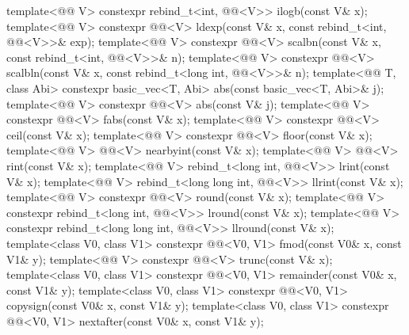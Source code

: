 \begin{itemdecl}
template<@@ V>
  constexpr rebind_t<int, @@<V>> ilogb(const V& x);
template<@@ V>
  constexpr @@<V> ldexp(const V& x, const rebind_t<int, @@<V>>& exp);
template<@@ V>
  constexpr @@<V> scalbn(const V& x, const rebind_t<int, @@<V>>& n);
template<@@ V>
  constexpr @@<V>
    scalbln(const V& x, const rebind_t<long int, @@<V>>& n);
template<@@ T, class Abi>
  constexpr basic_vec<T, Abi> abs(const basic_vec<T, Abi>& j);
template<@@ V>
  constexpr @@<V> abs(const V& j);
template<@@ V>
  constexpr @@<V> fabs(const V& x);
template<@@ V>
  constexpr @@<V> ceil(const V& x);
template<@@ V>
  constexpr @@<V> floor(const V& x);
template<@@ V>
  @@<V> nearbyint(const V& x);
template<@@ V>
  @@<V> rint(const V& x);
template<@@ V>
  rebind_t<long int, @@<V>> lrint(const V& x);
template<@@ V>
  rebind_t<long long int, @@<V>> llrint(const V& x);
template<@@ V>
  constexpr @@<V> round(const V& x);
template<@@ V>
  constexpr rebind_t<long int, @@<V>> lround(const V& x);
template<@@ V>
  constexpr rebind_t<long long int, @@<V>> llround(const V& x);
template<class V0, class V1>
  constexpr @@<V0, V1> fmod(const V0& x, const V1& y);
template<@@ V>
  constexpr @@<V> trunc(const V& x);
template<class V0, class V1>
  constexpr @@<V0, V1> remainder(const V0& x, const V1& y);
template<class V0, class V1>
  constexpr @@<V0, V1> copysign(const V0& x, const V1& y);
template<class V0, class V1>
  constexpr @@<V0, V1> nextafter(const V0& x, const V1& y);

\end{itemdecl}
